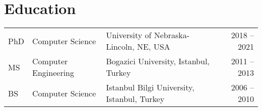 \documentclass[a4paper,10pt]{article}
\begin{document}
\maketitle


\section{Education}
\begin{tabular}{p{1cm}p{4cm}p{7cm}r}
PhD & Computer Science & University of Nebraska-Lincoln, NE, USA & 2018 -- 2021\\
MS & Computer Engineering & Bogazici University, Istanbul, Turkey & 2011 -- 2013\\
BS & Computer Science & Istanbul Bilgi University, Istanbul, Turkey & 2006 -- 2010
\end{tabular}
\vspace{0.5cm}
\end{document}
